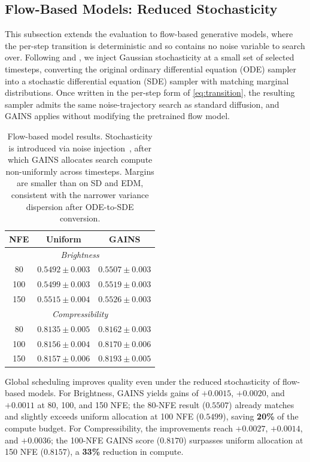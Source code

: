 \subsection{Flow-Based Models: Reduced Stochasticity}
\label{sec:appendix-flow}
%
This subsection extends the evaluation to flow-based generative models, where the per-step transition is deterministic and so contains no noise variable to search over. Following \citet{dockhorn2024stochastic} and \citet{kim2025rbf}, we inject Gaussian stochasticity at a small set of selected timesteps, converting the original ordinary differential equation (ODE) sampler into a stochastic differential equation (SDE) sampler with matching marginal distributions. Once written in the per-step form of \cref{eq:transition}, the resulting sampler admits the same noise-trajectory search as standard diffusion, and \textsc{GAINS} applies without modifying the pretrained flow model.

\begin{table}[h]
\centering
\caption{Flow-based model results. Stochasticity is introduced via noise injection~\citep{dockhorn2024stochastic}, after which \textsc{GAINS} allocates search compute non-uniformly across timesteps. Margins are smaller than on SD and EDM, consistent with the narrower variance dispersion after ODE-to-SDE conversion.}
\label{tab:flow_results}
\small
\begin{tabular}{c|c|c}
\toprule
\textbf{NFE} & \textbf{Uniform} & \textbf{GAINS} \\
\midrule
\multicolumn{3}{c}{\textit{Brightness}} \\
\midrule
80  & $0.5492\pm0.003$ & $\mathbf{0.5507\pm0.003}$ \\
100 & $0.5499\pm0.003$ & $\mathbf{0.5519\pm0.003}$ \\
150 & $0.5515\pm0.004$ & $\mathbf{0.5526\pm0.003}$ \\
\midrule
\multicolumn{3}{c}{\textit{Compressibility}} \\
\midrule
80  & $0.8135\pm0.005$ & $\mathbf{0.8162\pm0.003}$ \\
100 & $0.8156\pm0.004$ & $\mathbf{0.8170\pm0.006}$ \\
150 & $0.8157\pm0.006$ & $\mathbf{0.8193\pm0.005}$ \\
\bottomrule
\end{tabular}
\end{table}

Global scheduling improves quality even under the reduced stochasticity of flow-based models. For Brightness, \textsc{GAINS} yields gains of $+0.0015$, $+0.0020$, and $+0.0011$ at 80, 100, and 150 NFE; the 80-NFE result ($0.5507$) already matches and slightly exceeds uniform allocation at 100 NFE ($0.5499$), saving \textbf{20\%} of the compute budget. For Compressibility, the improvements reach $+0.0027$, $+0.0014$, and $+0.0036$; the 100-NFE \textsc{GAINS} score ($0.8170$) surpasses uniform allocation at 150 NFE ($0.8157$), a \textbf{33\%} reduction in compute.

